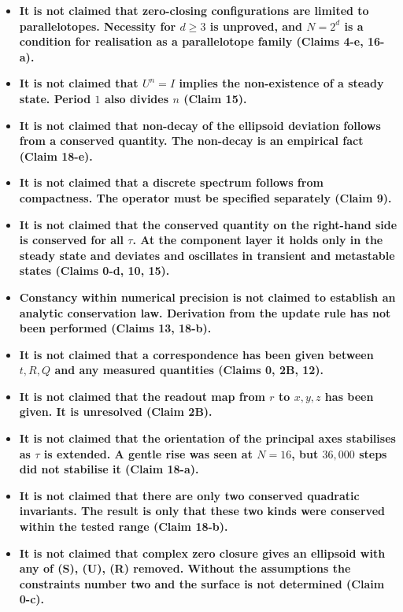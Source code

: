 \documentclass[
  10pt,
]{article}
\begin{document}
\begin{itemize}
{  3 maps a surface onto a surface. A general linear surjection maps a
  sphere onto a solid ellipsoid. The existence of the three-dimensional
  subspace \(U\) is underived (Claim 0-c).}
\item
  \textbf{It is not claimed that zero-closing configurations are limited
  to parallelotopes. Necessity for \(d\ge3\) is unproved, and \(N=2^d\)
  is a condition for realisation as a parallelotope family (Claims 4-e,
  16-a).}
\item
  \textbf{It is not claimed that \(U^n=I\) implies the non-existence of
  a steady state. Period \(1\) also divides \(n\) (Claim 15).}
\item
  \textbf{It is not claimed that non-decay of the ellipsoid deviation
  follows from a conserved quantity. The non-decay is an empirical fact
  (Claim 18-e).}
\item
  \textbf{It is not claimed that a discrete spectrum follows from
  compactness. The operator must be specified separately (Claim 9).}
\item
  \textbf{It is not claimed that the conserved quantity on the
  right-hand side is conserved for all \(\tau\). At the component layer
  it holds only in the steady state and deviates and oscillates in
  transient and metastable states (Claims 0-d, 10, 15).}
\item
  \textbf{Constancy within numerical precision is not claimed to
  establish an analytic conservation law. Derivation from the update
  rule has not been performed (Claims 13, 18-b).}
\item
  \textbf{It is not claimed that a correspondence has been given between
  \(t,R,Q\) and any measured quantities (Claims 0, 2B, 12).}
\item
  \textbf{It is not claimed that the readout map from \(r\) to \(x,y,z\)
  has been given. It is unresolved (Claim 2B).}
\item
  \textbf{It is not claimed that the orientation of the principal axes
  stabilises as \(\tau\) is extended. A gentle rise was seen at
  \(N=16\), but \(36{,}000\) steps did not stabilise it (Claim 18-a).}
\item
  \textbf{It is not claimed that there are only two conserved quadratic
  invariants. The result is only that these two kinds were conserved
  within the tested range (Claim 18-b).}
\item
  \textbf{It is not claimed that complex zero closure gives an ellipsoid
  with any of (S), (U), (R) removed. Without the assumptions the
  constraints number two and the surface is not determined (Claim 0-c).}

\end{itemize}
\end{document}
